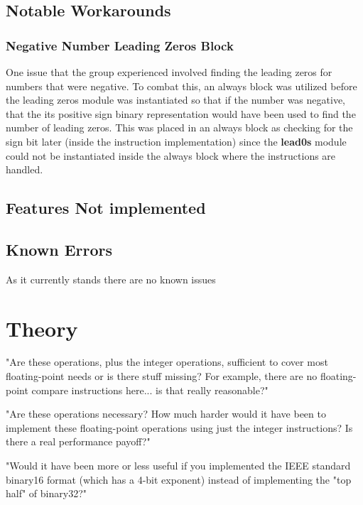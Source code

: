 \documentclass[conference]{IEEEtran}
\begin{document}
\subsection{Notable Workarounds}
\subsubsection{Negative Number Leading Zeros Block}
One issue that the group experienced involved finding the leading zeros for numbers that were 
negative. To combat this, an always block was utilized before the leading zeros module was instantiated
so that if the number was negative, that the its positive sign binary representation would have been
used to find the number of leading zeros. This was placed in an always block as checking for the sign bit later 
(inside the instruction implementation) since the \textbf{lead0s} module could not be instantiated inside
the always block where the instructions are handled. 



\subsection{Features Not implemented}


\subsection{Known Errors}
As it currently stands there are no known issues


\section{Theory}
"Are these operations, plus the integer operations, sufficient to cover most floating-point needs or is there stuff missing? 
For example, there are no floating-point compare instructions here... is that really reasonable?"

"Are these operations necessary? How much harder would it have been to implement these floating-point operations 
using just the integer instructions? Is there a real performance payoff?"

"Would it have been more or less useful if you implemented the IEEE standard binary16 format (which has a 4-bit exponent) 
instead of implementing the "top half" of binary32?"

\end{document}

